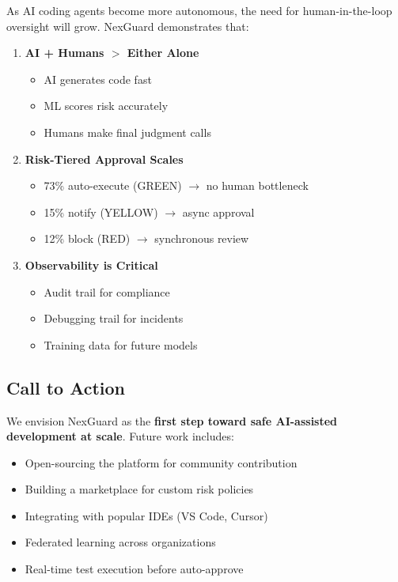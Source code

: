 \documentclass[11pt,a4paper]{article}
\begin{document}
As AI coding agents become more autonomous, the need for human-in-the-loop oversight will grow. NexGuard demonstrates that:

\begin{enumerate}
    \item \textbf{AI + Humans $>$ Either Alone}
    \begin{itemize}
        \item AI generates code fast
        \item ML scores risk accurately
        \item Humans make final judgment calls
    \end{itemize}
    
    \item \textbf{Risk-Tiered Approval Scales}
    \begin{itemize}
        \item 73\% auto-execute (GREEN) $\rightarrow$ no human bottleneck
        \item 15\% notify (YELLOW) $\rightarrow$ async approval
        \item 12\% block (RED) $\rightarrow$ synchronous review
    \end{itemize}
    
    \item \textbf{Observability is Critical}
    \begin{itemize}
        \item Audit trail for compliance
        \item Debugging trail for incidents
        \item Training data for future models
    \end{itemize}
\end{enumerate}

\subsection{Call to Action}

We envision NexGuard as the \textbf{first step toward safe AI-assisted development at scale}. Future work includes:

\begin{itemize}
    \item Open-sourcing the platform for community contribution
    \item Building a marketplace for custom risk policies
    \item Integrating with popular IDEs (VS Code, Cursor)
    \item Federated learning across organizations
    \item Real-time test execution before auto-approve
\end{itemize}
\end{document}
